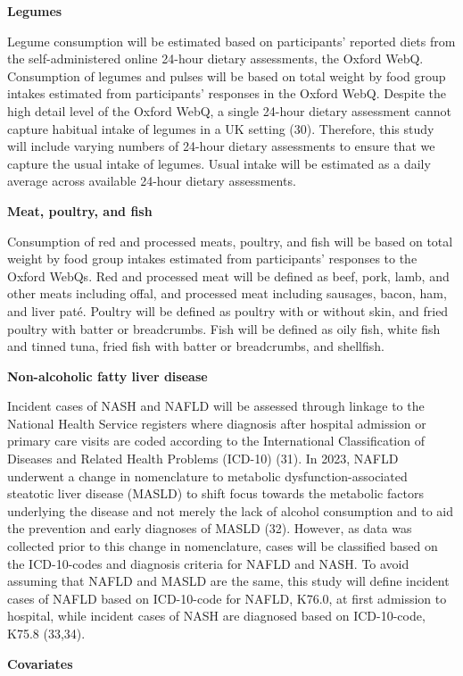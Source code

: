 \documentclass[
  11pt,
  a4paper,
  DIV=11,
  numbers=noendperiod,
  twocolumn]{scrartcl}
\begin{document}
\textbf{Legumes}

Legume consumption will be estimated based on participants' reported
diets from the self-administered online 24-hour dietary assessments, the
Oxford WebQ. Consumption of legumes and pulses will be based on total
weight by food group intakes estimated from participants' responses in
the Oxford WebQ. Despite the high detail level of the Oxford WebQ, a
single 24-hour dietary assessment cannot capture habitual intake of
legumes in a UK setting (30). Therefore, this study will include varying
numbers of 24-hour dietary assessments to ensure that we capture the
usual intake of legumes. Usual intake will be estimated as a daily
average across available 24-hour dietary assessments.

\textbf{Meat, poultry, and fish}

Consumption of red and processed meats, poultry, and fish will be based
on total weight by food group intakes estimated from participants'
responses to the Oxford WebQs. Red and processed meat will be defined as
beef, pork, lamb, and other meats including offal, and processed meat
including sausages, bacon, ham, and liver paté. Poultry will be defined
as poultry with or without skin, and fried poultry with batter or
breadcrumbs. Fish will be defined as oily fish, white fish and tinned
tuna, fried fish with batter or breadcrumbs, and shellfish.

\textbf{Non-alcoholic fatty liver disease}

Incident cases of NASH and NAFLD will be assessed through linkage to the
National Health Service registers where diagnosis after hospital
admission or primary care visits are coded according to the
International Classification of Diseases and Related Health Problems
(ICD-10) (31). In 2023, NAFLD underwent a change in nomenclature to
metabolic dysfunction-associated steatotic liver disease (MASLD) to
shift focus towards the metabolic factors underlying the disease and not
merely the lack of alcohol consumption and to aid the prevention and
early diagnoses of MASLD (32). However, as data was collected prior to
this change in nomenclature, cases will be classified based on the
ICD-10-codes and diagnosis criteria for NAFLD and NASH. To avoid
assuming that NAFLD and MASLD are the same, this study will define
incident cases of NAFLD based on ICD-10-code for NAFLD, K76.0, at first
admission to hospital, while incident cases of NASH are diagnosed based
on ICD-10-code, K75.8 (33,34).

\textbf{Covariates}
\end{document}
